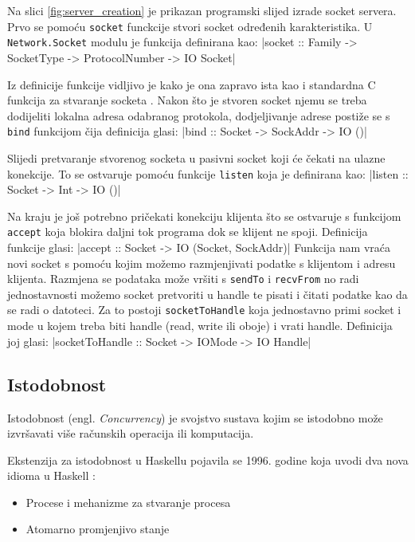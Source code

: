 Na slici \ref{fig:server_creation} je prikazan programski slijed izrade
socket servera. Prvo se pomoću \texttt{socket} funckcije stvori
socket određenih karakteristika. U \texttt{Network.Socket} modulu
je funkcija definirana kao:
|socket :: Family -> SocketType -> ProtocolNumber -> IO Socket|

Iz definicije funkcije vidljivo je kako je ona zapravo ista kao i standardna C
funkcija za stvaranje socketa \cite[str.132]{unixnetwork}. Nakon što je stvoren
socket njemu se treba dodijeliti lokalna adresa odabranog protokola,
dodjeljivanje adrese postiže se s \texttt{bind} funkcijom čija
definicija glasi:
|bind :: Socket -> SockAddr -> IO ()|

Slijedi pretvaranje stvorenog socketa u pasivni socket koji će čekati na ulazne
konekcije. To se ostvaruje pomoću funkcije \texttt{listen} koja je
definirana kao:
|listen :: Socket -> Int -> IO ()|

Na kraju je još potrebno pričekati konekciju klijenta što se ostvaruje s
funkcijom \texttt{accept} koja blokira daljni tok programa dok se
klijent ne spoji. Definicija funkcije glasi:
|accept :: Socket -> IO (Socket, SockAddr)|
Funkcija nam vraća novi socket s pomoću kojim možemo razmjenjivati podatke s
klijentom i adresu klijenta. Razmjena se podataka može vršiti s
\texttt{sendTo} i \texttt{recvFrom} no radi
jednostavnosti možemo socket pretvoriti u handle te pisati i čitati podatke
kao da se radi o datoteci. Za to postoji \texttt{socketToHandle}
koja jednostavno primi socket i mode u kojem treba biti handle (read, write ili
oboje) i vrati handle. Definicija joj glasi:
|socketToHandle :: Socket -> IOMode -> IO Handle|

\subsection{Istodobnost}

Istodobnost (engl. \emph{Concurrency}) je svojstvo sustava kojim se istodobno
može izvršavati više računskih operacija ili komputacija.

Ekstenzija za istodobnost u Haskellu pojavila se 1996. godine koja uvodi dva
nova idioma u Haskell \cite{concurrent}:
\begin{itemize}
        \item Procese i mehanizme za stvaranje procesa
        \item Atomarno promjenjivo stanje
\end{itemize}

